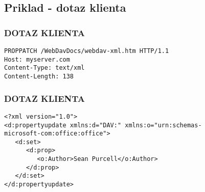 \documentclass{beamer}
\begin{document}
\subsection{Priklad - dotaz klienta}
\begin{frame}[fragile] %
\frametitle{DOTAZ KLIENTA}
\begin{example}
\begin{verbatim}
PROPPATCH /WebDavDocs/webdav-xml.htm HTTP/1.1
Host: myserver.com
Content-Type: text/xml
Content-Length: 138
   \end{verbatim}
\end{example}
\end{frame}

\begin{frame}[fragile]
\frametitle{DOTAZ KLIENTA}
\begin{example}
\begin{verbatim}
<?xml version="1.0">
<d:propertyupdate xmlns:d="DAV:" xmlns:o="urn:schemas-
microsoft-com:office:office">
   <d:set>
      <d:prop>
         <o:Author>Sean Purcell</o:Author>
      </d:prop>
   </d:set>
</d:propertyupdate>
   \end{verbatim}
\end{example}
\end{frame}
\end{document}
